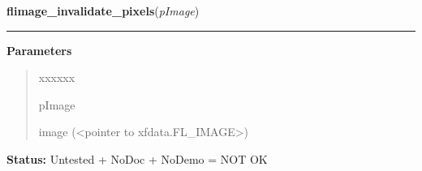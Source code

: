 \hspace{.8\funcindent}\begin{boxedminipage}{\funcwidth}

    \raggedright \textbf{flimage\_invalidate\_pixels}(\textit{pImage})

    \vspace{-1.5ex}

    \rule{\textwidth}{0.5\fboxrule}
\setlength{\parskip}{2ex}
\setlength{\parskip}{1ex}
      \textbf{Parameters}
      \vspace{-1ex}

      \begin{quote}
        \begin{Ventry}{xxxxxx}

          \item[pImage]

          image ({\textless}pointer to xfdata.FL\_IMAGE{\textgreater})

        \end{Ventry}

      \end{quote}

\textbf{Status:} Untested + NoDoc + NoDemo = NOT OK



    \end{boxedminipage}

    \label{xformslib:flflimage:flimage_open}

    \vspace{0.5ex}

